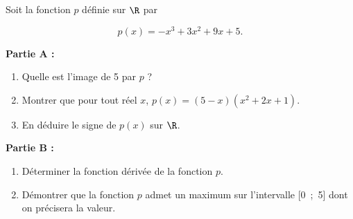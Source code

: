 \medskip

Soit la fonction $p$ définie sur $\R$ par 

\[p(x) = -x^3 +3x^2 + 9x + 5.\]

\smallskip

\textbf{Partie A :}

\medskip

\begin{enumerate}
\item Quelle est l'image de 5 par $p$ ?
\item Montrer que pour tout réel $x$,\: $p(x) = (5- x)\left(x^2 + 2x + 1\right)$.
\item En déduire le signe de $p(x)$ sur $\R$.
\end{enumerate}

\bigskip

\textbf{Partie B :}

\medskip

\begin{enumerate}
\item Déterminer la fonction dérivée de la fonction $p$.
\item Démontrer que la fonction $p$ admet un maximum sur l'intervalle [0~;~5] dont on
précisera la valeur.
\end{enumerate}

\bigskip
